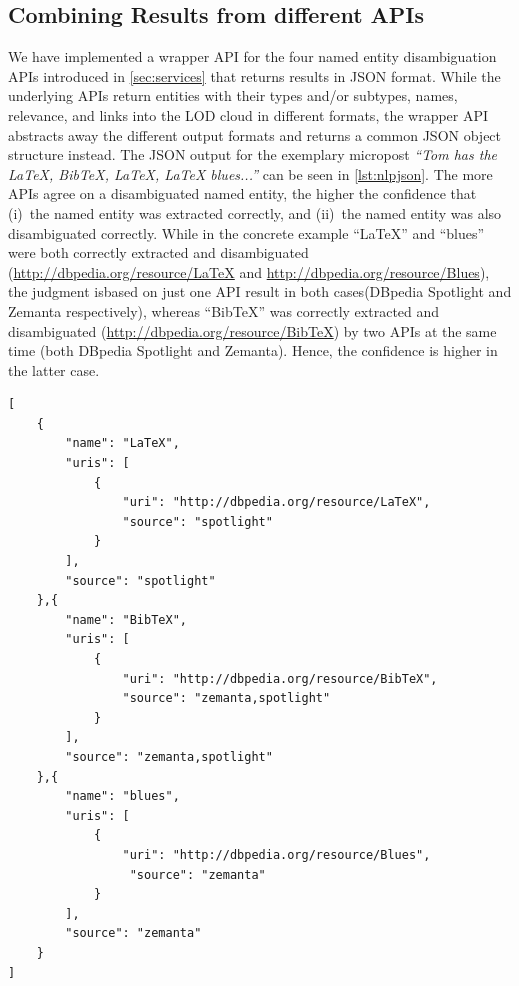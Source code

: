 \documentclass{iosart2c}
\begin{document}
\subsection{Combining Results from different APIs} \label{sec:consolidation-nlp}
We have implemented a wrapper API for the four named entity disambiguation APIs introduced in \autoref{sec:services} that returns results in JSON format.
While the underlying APIs return entities with their types and/or subtypes, names, relevance, and links into the LOD cloud in different formats, the wrapper API abstracts away the different output formats and returns a common JSON object structure instead.
The JSON output for the exemplary micropost \textit{``Tom has the LaTeX, BibTeX, LaTeX, LaTeX blues...''} can be seen in \autoref{lst:nlpjson}.
The more APIs agree on a disambiguated named entity, the higher the confidence that (i)~the named entity was extracted correctly, and (ii)~the named entity was also disambiguated correctly.
While  in the concrete example ``LaTeX'' and ``blues'' were both correctly extracted and disambiguated (\url{http://dbpedia.org/resource/LaTeX} and \url{http://dbpedia.org/resource/Blues}), the judgment is\linebreak based on just one API result in both cases\linebreak (DBpedia Spotlight and Zemanta respectively),
whereas ``BibTeX'' was correctly extracted and disambiguated (\url{http://dbpedia.org/resource/BibTeX}) by two APIs at the same time (both DBpedia Spotlight and Zemanta).
Hence, the confidence is higher in the latter case.

\begin{lstlisting}[caption=Named entity disambiguation wrapper API output in JSON format for an exemplary micropost.,label={lst:nlpjson}]
[
    {
        "name": "LaTeX",
        "uris": [
            {
                "uri": "http://dbpedia.org/resource/LaTeX",
                "source": "spotlight"
            }
        ],
        "source": "spotlight"
    },{
        "name": "BibTeX",
        "uris": [
            {
                "uri": "http://dbpedia.org/resource/BibTeX",
                "source": "zemanta,spotlight"
            }
        ],
        "source": "zemanta,spotlight"
    },{
        "name": "blues",
        "uris": [
            {
                "uri": "http://dbpedia.org/resource/Blues",
                 "source": "zemanta"
            }
        ],
        "source": "zemanta"
    }    
]
\end{lstlisting}
\end{document}

